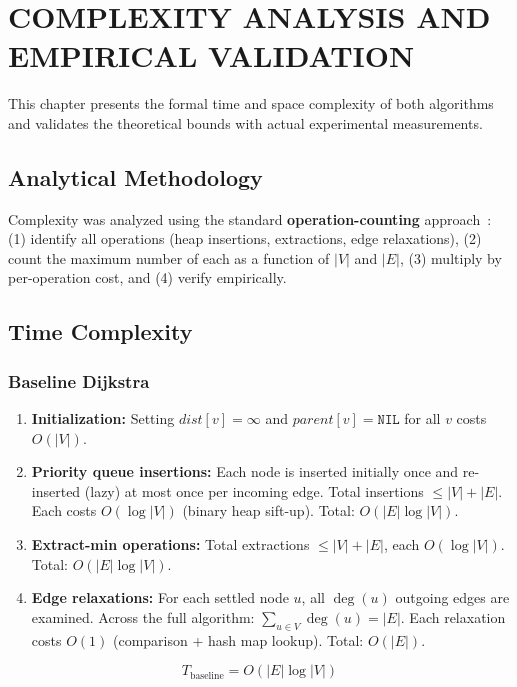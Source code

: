 \chapter{COMPLEXITY ANALYSIS AND EMPIRICAL VALIDATION}\label{chap:complexity}

This chapter presents the formal time and space complexity of both algorithms and validates the theoretical bounds with actual experimental measurements.

\section{Analytical Methodology}

Complexity was analyzed using the standard \textbf{operation-counting} approach~\citep{cormen2009}: (1) identify all operations (heap insertions, extractions, edge relaxations), (2) count the maximum number of each as a function of $|V|$ and $|E|$, (3) multiply by per-operation cost, and (4) verify empirically.

\section{Time Complexity}

\subsection{Baseline Dijkstra}

\begin{enumerate}
    \item \textbf{Initialization:} Setting $\mathit{dist}[v]=\infty$ and $\mathit{parent}[v]=\texttt{NIL}$ for all $v$ costs $O(|V|)$.
    \item \textbf{Priority queue insertions:} Each node is inserted initially once and re-inserted (lazy) at most once per incoming edge. Total insertions $\leq |V|+|E|$. Each costs $O(\log|V|)$ (binary heap sift-up). Total: $O(|E|\log|V|)$.
    \item \textbf{Extract-min operations:} Total extractions $\leq |V|+|E|$, each $O(\log|V|)$. Total: $O(|E|\log|V|)$.
    \item \textbf{Edge relaxations:} For each settled node $u$, all $\deg(u)$ outgoing edges are examined. Across the full algorithm: $\sum_{u\in V}\deg(u)=|E|$. Each relaxation costs $O(1)$ (comparison + hash map lookup). Total: $O(|E|)$.
\end{enumerate}

\[
T_{\text{baseline}} = O(|E|\log|V|)
\]

